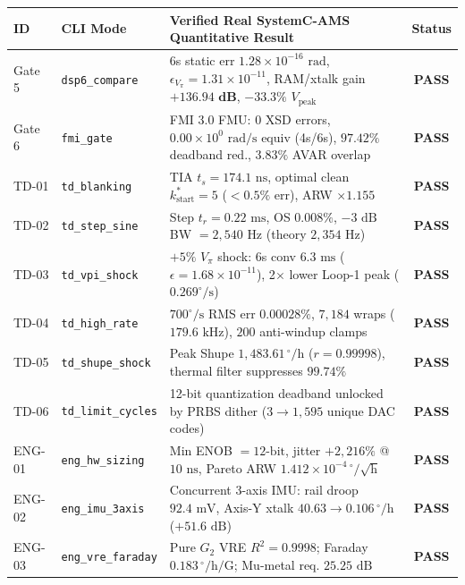 \documentclass[11pt,a4paper]{article}
\begin{document}
\scriptsize
\begin{tabularx}{\textwidth}{@{}l l X c@{}}
\toprule
\textbf{ID} & \textbf{CLI Mode} & \textbf{Verified Real SystemC-AMS Quantitative Result} & \textbf{Status} \\
\midrule
Gate 5 & \texttt{dsp6\_compare} & 6s static err $1.28\times 10^{-16}\text{ rad}$, $\epsilon_{V_\pi}=1.31\times 10^{-11}$, RAM/xtalk gain $\mathbf{+136.94\text{ dB}}$, $-33.3\%$ $V_{\text{peak}}$ & \textcolor{TealDark}{\textbf{PASS}} \\
Gate 6 & \texttt{fmi\_gate} & FMI 3.0 FMU: 0 XSD errors, $0.00\times 10^{0}\text{ rad/s}$ equiv (4s/6s), $97.42\%$ deadband red., $3.83\%$ AVAR overlap & \textcolor{TealDark}{\textbf{PASS}} \\
TD-01 & \texttt{td\_blanking} & TIA $t_s=174.1\text{ ns}$, optimal clean $k_{\text{start}}^*=5$ ($<0.5\%$ err), ARW $\times 1.155$ & \textcolor{TealDark}{\textbf{PASS}} \\
TD-02 & \texttt{td\_step\_sine} & Step $t_r=0.22\text{ ms}$, OS $0.008\%$, $-3\text{ dB}$ BW $= 2{,}540\text{ Hz}$ (theory $2{,}354\text{ Hz}$) & \textcolor{TealDark}{\textbf{PASS}} \\
TD-03 & \texttt{td\_vpi\_shock} & $+5\%$ $V_\pi$ shock: 6s conv $6.3\text{ ms}$ ($\epsilon=1.68\times 10^{-11}$), 2$\times$ lower Loop-1 peak ($0.269^\circ/\text{s}$) & \textcolor{TealDark}{\textbf{PASS}} \\
TD-04 & \texttt{td\_high\_rate} & $700^\circ/\text{s}$ RMS err $0.00028\%$, $7{,}184$ wraps ($179.6\text{ kHz}$), $200$ anti-windup clamps & \textcolor{TealDark}{\textbf{PASS}} \\
TD-05 & \texttt{td\_shupe\_shock} & Peak Shupe $1{,}483.61\,^\circ/\text{h}$ ($r=0.99998$), thermal filter suppresses $99.74\%$ & \textcolor{TealDark}{\textbf{PASS}} \\
TD-06 & \texttt{td\_limit\_cycles} & 12-bit quantization deadband unlocked by PRBS dither ($3 \to 1{,}595$ unique DAC codes) & \textcolor{TealDark}{\textbf{PASS}} \\
ENG-01 & \texttt{eng\_hw\_sizing} & Min ENOB $= 12\text{-bit}$, jitter $+2{,}216\%$ @ $10\text{ ns}$, Pareto ARW $1.412\times 10^{-4}\,^\circ/\sqrt{\text{h}}$ & \textcolor{TealDark}{\textbf{PASS}} \\
ENG-02 & \texttt{eng\_imu\_3axis} & Concurrent 3-axis IMU: rail droop $92.4\text{ mV}$, Axis-Y xtalk $40.63 \to 0.106\,^\circ/\text{h}$ ($+51.6\text{ dB}$) & \textcolor{TealDark}{\textbf{PASS}} \\
ENG-03 & \texttt{eng\_vre\_faraday} & Pure $G_2$ VRE $R^2=0.9998$; Faraday $0.183\,^\circ/\text{h/G}$; Mu-metal req. $25.25\text{ dB}$ & \textcolor{TealDark}{\textbf{PASS}} \\

\end{tabularx}
\end{document}
